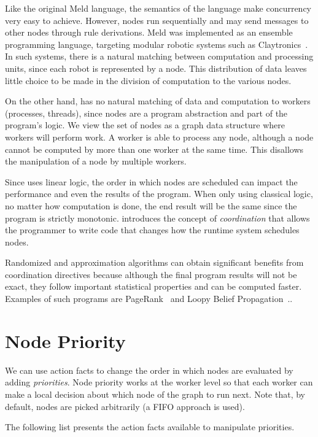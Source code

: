 Like the original Meld language, the semantics of the \lang language make concurrency very easy to achieve.
However, nodes run sequentially and may send messages to other nodes through rule derivations.
Meld was
implemented as an ensemble programming language, targeting modular robotic systems such as
Claytronics~\cite{ashley-rollman-derosa-iros07wksp}. In such systems, there is a natural matching
between computation and processing units, since each robot is represented by a node. This distribution
of data leaves little choice to be made in the division of computation to the various nodes.

On the other hand, \lang has no natural matching of data and computation to workers (processes, threads),
since nodes are a program abstraction and part of the program's logic.
We view the set of nodes as a graph data structure where workers will perform work.
A worker is able to process any node, although a node cannot be computed by more than one worker
at the same time. This disallows the manipulation of a node by multiple workers.

Since \lang uses linear logic, the order in which nodes are scheduled can impact the
performance and even the results of the program. When only using
classical logic, no matter how computation is done, the end result will be the same since the program
is strictly monotonic.
\lang introduces the concept of \emph{coordination} that allows the programmer
to write code that changes how the runtime system schedules nodes.

Randomized and approximation
algorithms can obtain significant benefits from coordination directives because although the final
program results will not be exact, they follow important statistical properties and can be computed faster.
Examples of such programs are PageRank~\cite{Lubachevsky:1986:CAA:4904.4801} and
Loopy Belief Propagation~\cite{Gonzalez+al:aistats09paraml}..

\section{Node Priority}

We can use action facts to change the order in which nodes are evaluated by adding
\emph{priorities}. Node priority works at the worker level
so that each worker can make a local decision about which node of the graph to run next.
Note that, by default, nodes are picked arbitrarily (a FIFO approach is used).

The following list presents the action facts available to manipulate priorities.

